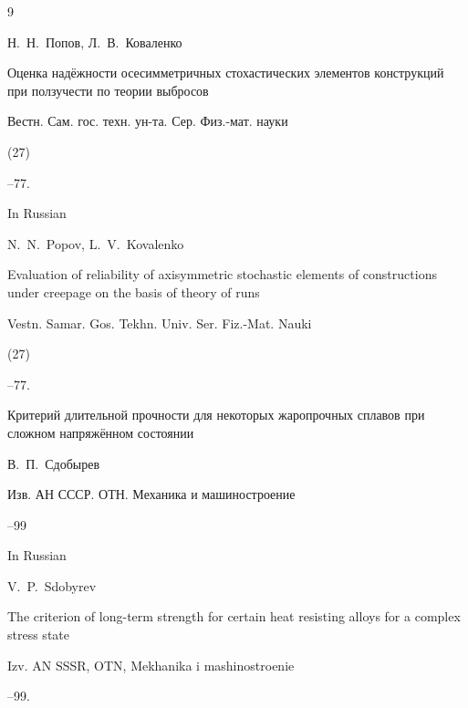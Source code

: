 \begin{thebibliography}{9}

\by Н.~Н.~Попов, Л.~В.~Коваленко

\paper Оценка надёжности осесимметричных стохастических элементов конструкций при ползучести по теории выбросов

\jour Вестн. Сам. гос. техн. ун-та. Сер. Физ.-мат. науки


(27)

--77.



\misctransl

\lang In Russian

\by N.~N.~Popov, L.~V.~Kovalenko

\paper Evaluation of reliability of axisymmetric stochastic elements of constructions under creepage on the basis of theory of runs

\jour Vestn. Samar. Gos. Tekhn. Univ. Ser. Fiz.-Mat. Nauki


(27)

--77.




\paper Критерий длительной прочности для некоторых жаропрочных сплавов при сложном напряжённом состоянии

\by В.~П.~Сдобырев 

\jour Изв. АН СССР. ОТН. Механика и машиностроение 



--99

\misctransl

\lang In Russian

\by V.~P.~Sdobyrev

\paper The criterion of long-term strength for certain heat resisting alloys for a complex stress state

\jour Izv. AN SSSR, OTN, Mekhanika i mashinostroenie



--99.








\end{thebibliography}
